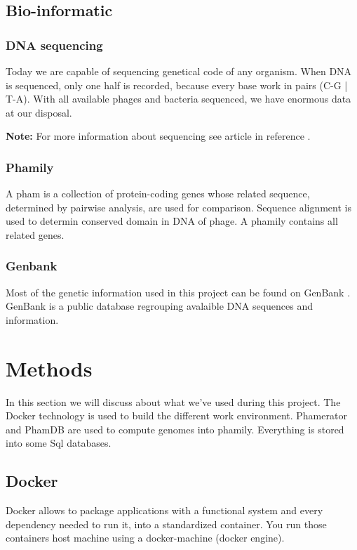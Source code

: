 \documentclass[a4paper,11pt]{report}
\begin{document}
\section{Bio-informatic}
\vspace{-0.6cm}
\subsection{DNA sequencing}
\vspace{-0.2cm}
Today we are capable of sequencing genetical code of any organism. When DNA is sequenced, only one half is recorded, because every base work in pairs (C-G | T-A). With all available phages and bacteria sequenced, we have enormous data at our disposal.

\textbf{Note:} For more information about sequencing see article in reference \cite{ref9}.

\subsection{Phamily}
\vspace{-0.2cm}
A pham is a collection of protein-coding genes whose related sequence, determined by pairwise analysis, are used for comparison. Sequence alignment is used to determin conserved domain in DNA of phage. A phamily contains all related genes.

\subsection{Genbank}
\vspace{-0.2cm}
Most of the genetic information used in this project can be found on GenBank \cite{ref10}. GenBank is a public database regrouping avalaible DNA sequences and information.


\chapter{Methods}
In this section we will discuss about what we've used during this project. The Docker technology is used to build the different work environment. Phamerator and PhamDB are used to compute genomes into phamily. Everything is stored into some Sql databases.

\section{Docker}
Docker allows to package applications with a functional system and every dependency needed to run it, into a standardized container. \cite{ref3} You run those containers host machine using a docker-machine (docker engine). 
\end{document}
